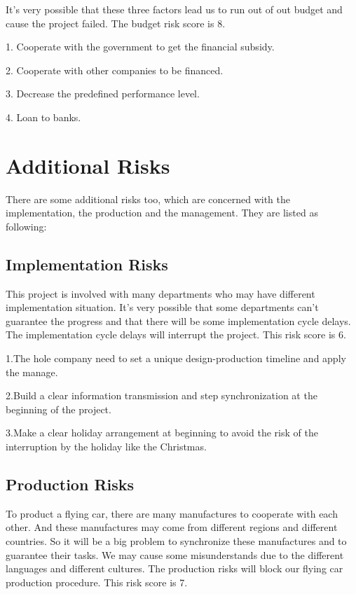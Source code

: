 It’s very possible that these three factors lead us to run out of out budget and cause the project failed. The budget risk score is 8.

1. Cooperate with the government to get the financial subsidy.

2. Cooperate with other companies to be financed.

3. Decrease the predefined performance level.

4. Loan to banks.

\section{Additional Risks}

There are some additional risks too, which are concerned with the implementation, the production and the management. They are listed as following:

\subsection{Implementation Risks}

This project is involved with many departments who may have different implementation situation. It’s very possible that some departments can’t guarantee the progress and that there will be some implementation cycle delays. The implementation cycle delays will interrupt the project. This risk score is 6.

1.The hole company need to set a unique design-production timeline and apply the manage.

2.Build a clear information transmission and step synchronization at the beginning of the project.

3.Make a clear holiday arrangement at beginning to avoid the risk of the interruption by the holiday like the Christmas.

\subsection{Production Risks}

To product a flying car, there are many manufactures to cooperate with each other. And these manufactures may come from different regions and different countries. So it will be a big problem to synchronize these manufactures and to guarantee their tasks. We may cause some misunderstands due to the different languages and different cultures. The production risks will block our flying car production procedure. This risk score is 7.

